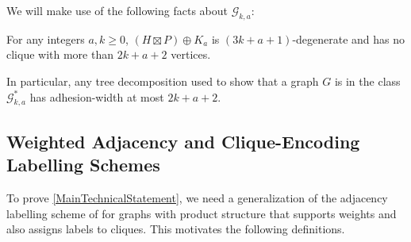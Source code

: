 \documentclass{patmorin}
\newcommand{\torso}[2]{{#1}\langle{#2}\rangle}
\renewcommand{\ge}{\geqslant}
\renewcommand{\le}{\leqslant}
\newcommand{\pat}[1]{\textcolor{Blue}{PaMo: #1}}
\newcommand{\defin}[1]{\emph{\textcolor{brightmaroon}{#1}}}
\begin{document}

We will make use of the following facts about $\mathcal{G}_{k,a}$:

\begin{obs}[\citep{HW25}] \label{gka_parameters}
    For any integers $a,k\ge 0$,  $(H\boxtimes P)\oplus K_a$ is $(3k+a+1)$-degenerate and has no clique with more than  $2k+a+2$ vertices.
\end{obs}

  In particular, any tree decomposition used to show that a graph $G$ is in the class $\mathcal{G}^*_{k,a}$ has adhesion-width at most $2k+a+2$.

  \subsection{Weighted Adjacency and Clique-Encoding Labelling Schemes}

  To prove \cref{MainTechnicalStatement}, we need a generalization of the adjacency labelling scheme of \citet{dujmovic.esperet.ea:adjacency} for graphs with product structure that supports weights and also assigns labels to cliques.  This motivates the following definitions.


\end{document}
